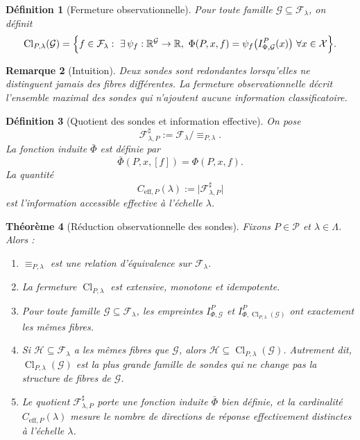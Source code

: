 \documentclass[11pt,a4paper,openany]{book}
\newtheorem{definition}{Définition}[chapter]
\newtheorem{theorem}[definition]{Théorème}
\newtheorem{remark}[definition]{Remarque}
\begin{document}
\begin{definition}[Fermeture observationnelle]
Pour toute famille \(\mathcal G\subseteq\mathcal F_\lambda\), on définit
\[
\operatorname{Cl}_{P,\lambda}(\mathcal G)
=
\Bigl\{
f\in\mathcal F_\lambda:\ \exists\,\psi_f:\mathbb R^{\mathcal G}\to\mathbb R,\ 
\Phi(P,x,f)=\psi_f\bigl(I_{\Phi,\mathcal G}^P(x)\bigr)\ \forall x\in\mathcal X
\Bigr\}.
\]
\end{definition}

\begin{remark}[Intuition]
Deux sondes sont redondantes lorsqu'elles ne distinguent jamais des fibres différentes. La fermeture observationnelle décrit l'ensemble maximal des sondes qui n'ajoutent aucune information classificatoire.
\end{remark}

\begin{definition}[Quotient des sondes et information effective]
On pose
\[
\mathcal F_{\lambda,P}^{\sharp}:=\mathcal F_\lambda/\!\equiv_{P,\lambda}.
\]
La fonction induite \(\bar\Phi\) est définie par
\[
\bar\Phi(P,x,[f])=\Phi(P,x,f).
\]
La quantité
\[
C_{\mathrm{eff},P}(\lambda):=\bigl|\mathcal F_{\lambda,P}^{\sharp}\bigr|
\]
est l'information accessible \emph{effective} à l'échelle \(\lambda\).
\end{definition}

\begin{theorem}[Réduction observationnelle des sondes]
Fixons \(P\in\mathcal P\) et \(\lambda\in\Lambda\). Alors :
\begin{enumerate}[label=\arabic*.]
\item \(\equiv_{P,\lambda}\) est une relation d'équivalence sur \(\mathcal F_\lambda\).
\item La fermeture \(\operatorname{Cl}_{P,\lambda}\) est extensive, monotone et idempotente.
\item Pour toute famille \(\mathcal G\subseteq\mathcal F_\lambda\), les empreintes \(I_{\Phi,\mathcal G}^P\) et \(I_{\Phi,\operatorname{Cl}_{P,\lambda}(\mathcal G)}^P\) ont exactement les mêmes fibres.
\item Si \(\mathcal H\subseteq\mathcal F_\lambda\) a les mêmes fibres que \(\mathcal G\), alors \(\mathcal H\subseteq \operatorname{Cl}_{P,\lambda}(\mathcal G)\). Autrement dit, \(\operatorname{Cl}_{P,\lambda}(\mathcal G)\) est la plus grande famille de sondes qui ne change pas la structure de fibres de \(\mathcal G\).
\item Le quotient \(\mathcal F_{\lambda,P}^{\sharp}\) porte une fonction induite \(\bar\Phi\) bien définie, et la cardinalité \(C_{\mathrm{eff},P}(\lambda)\) mesure le nombre de directions de réponse effectivement distinctes à l'échelle \(\lambda\).
\end{enumerate}
\end{theorem}
\end{document}
